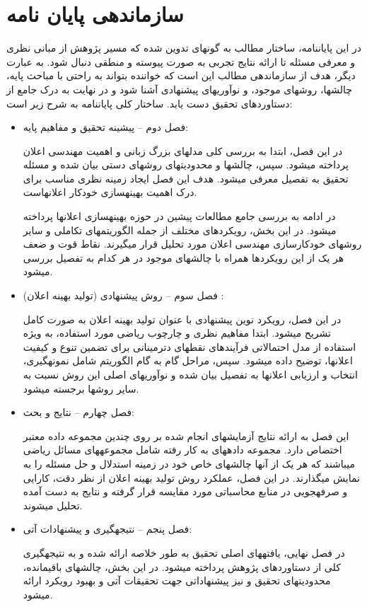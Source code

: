 \section{سازماندهی پایان نامه}\label{organiz}
در این پایان\/نامه، ساختار مطالب به گونه\/ای تدوین شده که مسیر پژوهش از مبانی نظری و معرفی مسئله تا ارائه نتایج تجربی به صورت پیوسته و منطقی دنبال شود. به عبارت دیگر، هدف از سازماندهی مطالب این است که خواننده بتواند به راحتی با مباحث پایه، چالش\/ها، روش\/های موجود، و نوآوری\/های پیشنهادی آشنا شود و در نهایت به درک جامع از دستاوردهای تحقیق دست یابد. ساختار کلی پایان\/نامه  به شرح زیر است:

\begin{itemize}
	\item فصل دوم – پیشینه تحقیق و مفاهیم پایه:
	
	در این فصل، ابتدا به بررسی کلی مدل\/های بزرگ زبانی و اهمیت مهندسی اعلان پرداخته می\/شود. سپس، چالش\/ها و محدودیت\/های روش\/های دستی بیان شده و مسئله تحقیق به تفصیل معرفی می\/شود. هدف این فصل ایجاد زمینه نظری مناسب برای درک اهمیت بهینه\/سازی خودکار اعلان\/هاست.
	
	در ادامه به بررسی جامع مطالعات پیشین در حوزه بهینه\/سازی اعلان\/ها پرداخته می\/شود. در این بخش، رویکردهای مختلف از جمله الگوریتم\/های تکاملی و سایر روش\/های خودکارسازی مهندسی اعلان مورد تحلیل قرار می\/گیرند. نقاط قوت و ضعف هر یک از این رویکردها همراه با چالش\/های موجود در هر کدام به تفصیل بررسی می\/شود.
	
	\item فصل سوم – روش پیشنهادی (تولید بهینه اعلان) :
	
	در این فصل، رویکرد نوین پیشنهادی با عنوان تولید بهینه اعلان به صورت کامل تشریح می\/شود. ابتدا مفاهیم نظری و چارچوب ریاضی مورد استفاده، به ویژه استفاده از مدل احتمالاتی فرآیندهای نقطه\/ای دترمینانی برای تضمین تنوع و کیفیت اعلان\/ها، توضیح داده می\/شود. سپس، مراحل گام به گام الگوریتم شامل نمونه\/گیری، انتخاب و ارزیابی اعلان\/ها به تفصیل بیان شده و نوآوری\/های اصلی این روش نسبت به سایر روش\/ها برجسته می\/شود.
	
	\item فصل چهارم – نتایج و بحث:
	
	این فصل به ارائه نتایج آزمایش\/های انجام شده بر روی چندین مجموعه داده معتبر اختصاص دارد. مجموعه داده\/های به کار رفته شامل مجموعه\/های مسائل ریاضی می\/باشند که هر یک از آن\/ها چالش\/های خاص خود در زمینه استدلال و حل مسئله را به نمایش می\/گذارند. در این فصل، عملکرد روش تولید بهینه اعلان از نظر دقت، کارایی و صرفه\/جویی در منابع محاسباتی مورد مقایسه قرار گرفته و نتایج به دست آمده تحلیل می\/شوند.
	
	\item فصل پنجم – نتیجه\/گیری و پیشنهادات آتی:
	
	در فصل نهایی، یافته\/های اصلی تحقیق به طور خلاصه ارائه شده و به نتیجه\/گیری کلی از دستاوردهای پژوهش پرداخته می\/شود. در این بخش، چالش\/های باقی\/مانده، محدودیت\/های تحقیق و نیز پیشنهاداتی جهت تحقیقات آتی و بهبود رویکرد ارائه می\/شود.
\end{itemize}



